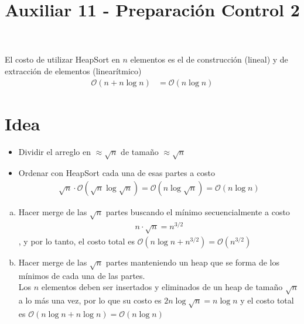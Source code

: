 \documentclass[dcc,sol]{fcfmcourse}
\title{Auxiliar 11 - Preparación Control 2}
\begin{document}
\maketitle

\vspace{-1ex}


\begin{problems}

\problem
\problem El costo de utilizar HeapSort en $n$ elementos es el de construcción (lineal) y de extracción de elementos (linearítmico)
\begin{align*}
    \mathcal{O}(n + n\log n) &= \mathcal{O}(n\log n)
\end{align*}
\section*{Idea}
\begin{itemize}
    \item  Dividir el arreglo en $\approx \sqrt{n}$ de tamaño $\approx \sqrt{n}$
    \item Ordenar con HeapSort cada una de esas partes a costo
    \begin{align*}
        \sqrt{n}\cdot \mathcal{O}(\sqrt{n} \log{\sqrt{n}}) = \mathcal{O}(n\log{\sqrt{n}}) = \mathcal{O}(n\log n)
    \end{align*}
\end{itemize}
\begin{enumerate}[a)]
    \item Hacer merge de las $\sqrt{n}$ partes buscando el mínimo secuencialmente a costo
    \begin{align*}
        n \cdot \sqrt{n} = n^{3/2}
    \end{align*}
    , y por lo tanto, el costo total es $\mathcal{O}(n\log n + n ^{3/2}) = \mathcal{O}(n^{3/2})$
    \item Hacer merge de las $\sqrt{n}$ partes manteniendo un heap que se forma de los mínimos de cada una de las partes.\\
    
    Los $n$ elementos deben ser insertados y eliminados de un heap de tamaño $\sqrt{n}$ a lo más una vez, por lo que su costo es $2n\log{\sqrt{n}} = n\log n$ y el costo total es $\mathcal{O}(n\log n + n\log n) = \mathcal{O}(n\log n)$
\end{enumerate}
\problem
\end{problems}
\end{document}
